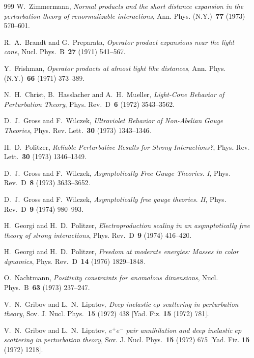 \begin{thebibliography}{999}
W.~Zimmermann, \emph{Normal products and the short distance expansion in the perturbation theory of renormalizable interactions}, Ann. Phys. (N.Y.)~\textbf{77} (1973) \mbox{570--601}.

R.~A.~Brandt and G.~Preparata, \emph{Operator product expansions near the light cone}, Nucl. Phys.~B~\textbf{27} (1971) \mbox{541--567}.

Y.~Frishman, \emph{Operator products at almost light like distances}, Ann. Phys. (N.Y.)~\textbf{66} (1971) \mbox{373--389}.

N.~H.~Christ, B.~Hasslacher and A.~H.~Mueller, \emph{Light-Cone Behavior of Perturbation Theory}, Phys. Rev.~D~\textbf{6} (1972) \mbox{3543--3562}.

D.~J.~Gross and F.~Wilczek, \emph{Ultraviolet Behavior of Non-Abelian Gauge Theories}, Phys. Rev. Lett.~\textbf{30} (1973) \mbox{1343--1346}.

H.~D.~Politzer, \emph{Reliable Perturbative Results for Strong Interactions?}, Phys. Rev. Lett.~\textbf{30} (1973) \mbox{1346--1349}.

D.~J.~Gross and F.~Wilczek, \emph{Asymptotically Free Gauge Theories. I}, Phys. Rev.~D~\textbf{8} (1973) \mbox{3633--3652}.

D.~J.~Gross and F.~Wilczek, \emph{Asymptotically free gauge theories. II}, Phys. Rev.~D~\textbf{9} (1974) \mbox{980--993}.

H.~Georgi and H.~D.~Politzer, \emph{Electroproduction scaling in an asymptotically free theory of strong interactions}, Phys. Rev.~D~\textbf{9} (1974) \mbox{416--420}.

H.~Georgi and H.~D.~Politzer, \emph{Freedom at moderate energies: Masses in color dynamics}, Phys. Rev.~D~\textbf{14} (1976) \mbox{1829--1848}.

O.~Nachtmann, \emph{Positivity constraints for anomalous dimensions}, Nucl. Phys.~B~\textbf{63} (1973) \mbox{237--247}.

V.~N.~Gribov and L.~N.~Lipatov, \emph{Deep inelastic $e p$ scattering in perturbation theory}, Sov. J. Nucl. Phys.~\textbf{15} (1972) \mbox{438} [Yad. Fiz. \textbf{15} (1972) \mbox{781}].

V.~N.~Gribov and L.~N.~Lipatov, \emph{$e^+e^-$ pair annihilation and deep inelastic $e p$ scattering in perturbation theory}, Sov. J. Nucl. Phys.~\textbf{15} (1972) \mbox{675} [Yad. Fiz. \textbf{15} (1972) \mbox{1218}].


\end{thebibliography}
